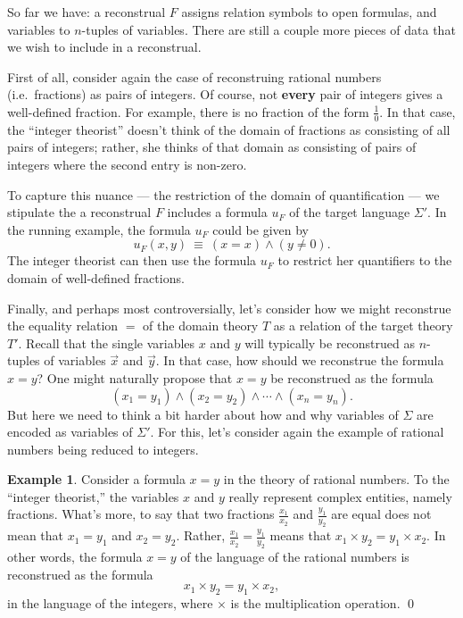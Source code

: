 \documentclass[11pt,fleqn]{article}
\theoremstyle{definition}
\newtheorem*{example}{Example}
\theoremstyle{remark}
\newcommand{\2}{\mathscr}
\renewcommand{\emph}{\textbf}
\begin{document}
  So far we have: a reconstrual $F$ assigns relation symbols to open
  formulas, and variables to $n$-tuples of variables.  There are still
  a couple more pieces of data that we wish to include in a
  reconstrual.

  First of all, consider again the case of reconstruing rational
  numbers (i.e.\ fractions) as pairs of integers.  Of course, not
  \emph{every} pair of integers gives a well-defined fraction.  For
  example, there is no fraction of the form $\frac{1}{0}$.  In that
  case, the ``integer theorist'' doesn't think of the domain of
  fractions as consisting of all pairs of integers; rather, she thinks
  of that domain as consisting of pairs of integers where the second
  entry is non-zero.

  To capture this nuance --- the restriction of the domain of
  quantification --- we stipulate the a reconstrual $F$ includes a
  formula $u_F$ of the target language $\Sigma '$.  In the running
  example, the formula $u_F$ could be given by
  \[ u_F(x,y) \: \equiv \: (x=x)\wedge (y\neq 0) .\] The integer
  theorist can then use the formula $u_F$ to restrict her quantifiers
  to the domain of well-defined fractions.

  Finally, and perhaps most controversially, let's consider how we
  might reconstrue the equality relation $=$ of the domain theory $T$
  as a relation of the target theory $T'$.  Recall that the single
  variables $x$ and $y$ will typically be reconstrued as $n$-tuples of
  variables $\vec{x}$ and $\vec{y}$.  In that case, how should we
  reconstrue the formula $x=y$?  One might naturally propose that
  $x=y$ be reconstrued as the formula
  \begin{equation} (x_1=y_1)\wedge (x_2=y_2)\wedge \cdots \wedge
    (x_n=y_n) .\label{simple} \end{equation} But here we need to think
  a bit harder about how and why variables of $\Sigma$ are encoded as
  variables of $\Sigma '$.  For this, let's consider again the example
  of rational numbers being reduced to integers.

  \begin{example} Consider a formula $x=y$ in the theory of rational
    numbers.  To the ``integer theorist,'' the variables $x$ and $y$
    really represent complex entities, namely fractions.  What's more,
    to say that two fractions $\frac{x_1}{x_2}$ and $\frac{y_1}{y_2}$
    are equal does not mean that $x_1=y_1$ and $x_2=y_2$.  Rather,
    $\frac{x_1}{x_2}=\frac{y_1}{y_2}$ means that
    $x_1\times y_2=y_1\times x_2$.  In other words, the formula $x=y$
    of the language of the rational numbers is reconstrued as the
    formula
    \begin{equation} x_1\times y_2=y_1\times x_2
      ,\label{foo} \end{equation} in the language of the integers,
    where $\times$ is the multiplication operation. \hfill
    \qed \end{example}
\end{document}

